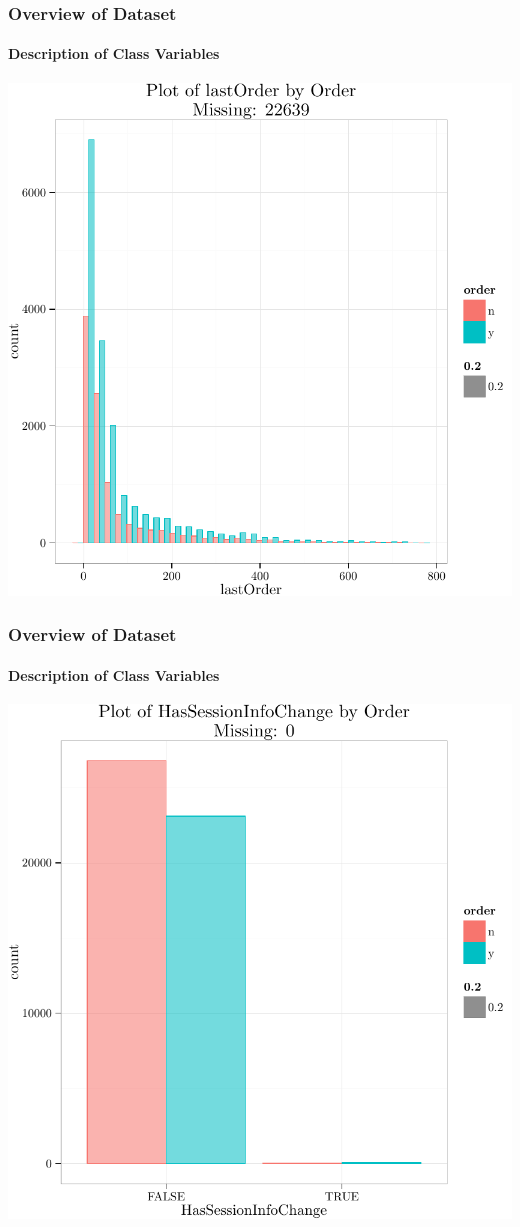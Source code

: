 \documentclass[xcolor=dvipsnames,gray,mathserif]{beamer}
\begin{document}
\begin{frame}
   \frametitle{Overview of Dataset}
   \framesubtitle{Description of Class Variables}

   \centerline{\includegraphics[width=.8\linewidth,height=.8\linewidth]{./figs/graphics-SingleDimPlot9}}
\end{frame}
\begin{frame}
   \frametitle{Overview of Dataset}
   \framesubtitle{Description of Class Variables}

   \centerline{\includegraphics[width=.8\linewidth,height=.8\linewidth]{./figs/graphics-SingleDimPlot10}}

\end{frame}
\end{document}
